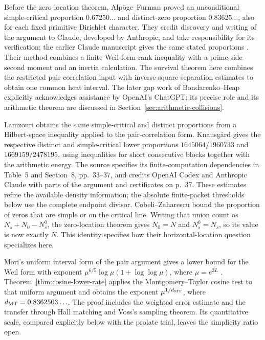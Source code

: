 \documentclass[11pt,a4paper]{article}
\theoremstyle{definition}
\theoremstyle{remark}
\begin{document}
Before the zero-location theorem, Alp\"oge--Furman \cite[Theorems~A--B, pp.~1--2]{alpoge-furman2026} proved an unconditional simple-critical proportion $0.67250\ldots$ and distinct-zero proportion $0.83625\ldots$, also for each fixed primitive Dirichlet character. They credit discovery and writing of the argument to Claude, developed by Anthropic, and take responsibility for its verification; the earlier Claude manuscript gives the same stated proportions \cite[Theorems~A--B, pp.~1--2]{Claude2026}. Their method combines a finite Weil-form rank inequality with a prime-side second moment and an inertia calculation. The survival theorem here combines the restricted pair-correlation input with inverse-square separation estimates to obtain one common heat interval. The later gap work of Bondarenko--Heap explicitly acknowledges assistance by OpenAI's ChatGPT; its precise role and its arithmetic theorem are discussed in Section~\ref{sec:arithmetic-collisions}.

Lamzouri \cite[Theorem~1.1, p.~3; Section~2, pp.~4--8]{lamzouri-simple2026} obtains the same simple-critical and distinct proportions from a Hilbert-space inequality applied to the pair-correlation form. Knausg\aa rd \cite[Theorems~1.1 and~1.3, pp.~2--3]{knausgard2026} gives the respective distinct and simple-critical lower proportions $1645064/1960733$ and $1669159/2478195$, using inequalities for short consecutive blocks together with the arithmetic energy. The source specifies its finite-computation dependencies in Table~5 and Section~8, pp.~33--37, and credits OpenAI Codex and Anthropic Claude with parts of the argument and certificates on p.~37. These estimates refine the available density information; the absolute finite-packet thresholds below use the complete endpoint divisor. Cobeli--Zaharescu \cite[Theorem~1, p.~2]{cobeli-zaharescu2026} bound the proportion of zeros that are simple or on the critical line. Writing that union count as $N_s+N_0-N_s^0$, the zero-location theorem gives $N_0=N$ and $N_s^0=N_s$, so its value is now exactly $N$. This identity specifies how their horizontal-location question specializes here.

Mori's uniform interval form of the pair argument gives a lower
bound for the Weil form with exponent \(\mu^{6/5}\log\mu
(1+\log\log\mu)\), where \(\mu=e^{2L}\)
\cite[Theorem~4.3, pp.~11--13]{mori-rh-alone2026}.
Theorem~\ref{thm:cosine-lower-rate} applies the Montgomery--Taylor
cosine test to that uniform argument and obtains the exponent
\(\mu^{1/d_{\rm MT}}\), where \(d_{\rm MT}=0.8362503\ldots\).
The proof includes the weighted error estimate and the transfer through
Hall matching and Voss's sampling theorem. Its quantitative scale,
compared explicitly below with the prolate trial, leaves the simplicity
ratio open.
\end{document}
